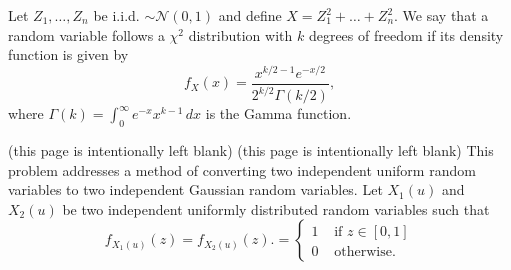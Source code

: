 Let $Z_1,\ldots,Z_n$ be i.i.d. $\sim\mathcal{N}(0,1)$ and define $X=Z_1^2+\ldots+Z_n^2$. We say that a random variable follows a $\chi^2$ distribution with $k$ degrees of freedom if its density function is given by $$f_X(x)=\frac{x^{k/2-1}e^{-x/2}}{2^{k/2}\Gamma(k/2)},$$ where $\Gamma(k)=\int_0^\infty e^{-x}x^{k-1}\,dx$ is the Gamma function.
\newpage (this page is intentionally left blank)
\newpage (this page is intentionally left blank)
\newpage
This problem addresses a method of converting two independent uniform random variables to two independent Gaussian random variables. Let $X_1(u)$ and $X_2(u)$ be two independent uniformly distributed random variables such that $$f_{X_1(u)}(z)=f_{X_2(u)}(z).=\begin{cases}1&\text{ if $z\in[0,1]$}\\0&\text{ otherwise.}\end{cases}$$ 
